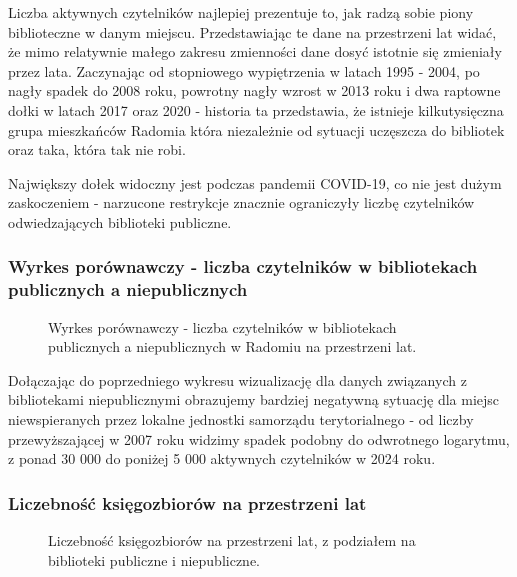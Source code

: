 \documentclass[12pt]{article}
\begin{document}
Liczba aktywnych czytelników najlepiej prezentuje to, jak radzą sobie piony biblioteczne w danym miejscu. Przedstawiając te dane na 
przestrzeni lat widać, że mimo relatywnie małego zakresu zmienności dane dosyć istotnie się zmieniały przez lata. Zaczynając od stopniowego
wypiętrzenia w latach 1995 - 2004, po nagły spadek do 2008 roku, powrotny nagły wzrost w 2013 roku i dwa raptowne dołki w latach 2017 
oraz 2020 - historia ta przedstawia, że istnieje kilkutysięczna grupa mieszkańców Radomia która niezależnie od sytuacji uczęszcza do 
bibliotek oraz taka, która tak nie robi.

Największy dołek widoczny jest podczas pandemii COVID-19, co nie jest dużym zaskoczeniem - narzucone restrykcje znacznie ograniczyły liczbę
czytelników odwiedzających biblioteki publiczne.

\subsubsection{Wyrkes porównawczy - liczba czytelników w bibliotekach publicznych a niepublicznych}
\begin{figure}[H]
    
    \caption{Wyrkes porównawczy - liczba czytelników w bibliotekach publicznych a niepublicznych w Radomiu na przestrzeni lat.}
\end{figure}

Dołączając do poprzedniego wykresu wizualizację dla danych związanych z bibliotekami niepublicznymi obrazujemy bardziej negatywną sytuację
dla miejsc niewspieranych przez lokalne jednostki samorządu terytorialnego - od liczby przewyższającej w 2007 roku widzimy spadek 
podobny do odwrotnego logarytmu, z ponad 30 000 do poniżej 5 000 aktywnych czytelników w 2024 roku. 

%     



\subsubsection{Liczebność księgozbiorów na przestrzeni lat}
\begin{figure}[H]
    
    \caption{Liczebność księgozbiorów na przestrzeni lat, z podziałem na biblioteki publiczne i niepubliczne.}
\end{figure}
\end{document}
